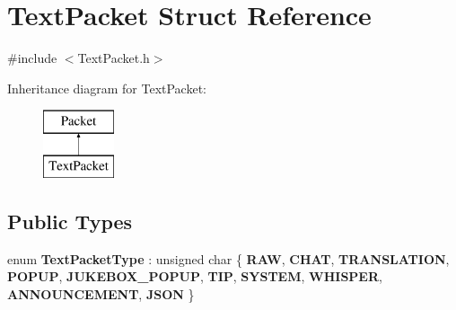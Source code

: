 \hypertarget{struct_text_packet}{}\section{Text\+Packet Struct Reference}
\label{struct_text_packet}


{\ttfamily \#include $<$Text\+Packet.\+h$>$}

Inheritance diagram for Text\+Packet\+:\begin{figure}[H]
\begin{center}
\leavevmode
\includegraphics[height=2.000000cm]{struct_text_packet}
\end{center}
\end{figure}
\subsection*{Public Types}
\begin{DoxyCompactItemize}
\item 
\mbox{\label{struct_text_packet_ab7fd3a07866f68f65f0dcde5ac175210}} 
enum {\bfseries Text\+Packet\+Type} \+: unsigned char \{ \newline
{\bfseries R\+AW}, 
{\bfseries C\+H\+AT}, 
{\bfseries T\+R\+A\+N\+S\+L\+A\+T\+I\+ON}, 
{\bfseries P\+O\+P\+UP}, 
\newline
{\bfseries J\+U\+K\+E\+B\+O\+X\+\_\+\+P\+O\+P\+UP}, 
{\bfseries T\+IP}, 
{\bfseries S\+Y\+S\+T\+EM}, 
{\bfseries W\+H\+I\+S\+P\+ER}, 
\newline
{\bfseries A\+N\+N\+O\+U\+N\+C\+E\+M\+E\+NT}, 
{\bfseries J\+S\+ON}
 \}
\end{DoxyCompactItemize}
